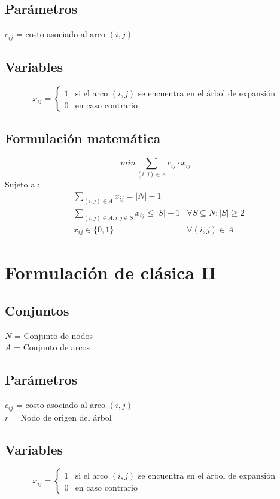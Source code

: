 \documentclass{article}
\numberwithin{equation}{section}
\begin{document}
\subsection{Parámetros}
$c_{ij}$ = costo asociado al arco $(i,j)$
\subsection{Variables}
\begin{flushleft}
\[x_{ij}={\begin{cases}1&{\mbox{si el arco $(i,j)$ se encuentra en el árbol de expansión}}\\0&{\mbox{en caso contrario}}\end{cases}}
\]
\end{flushleft}
\subsection{Formulación matemática}
\begin{equation}
min \sum_{(i,j) \in A} c_{ij} \cdot x_{ij}
\end{equation}
Sujeto a : \begin{align}
& \sum_{(i,j) \in A} x_{ij} = |N| - 1\\
& \sum_{(i,j) \in A: i,j \in S} x_{ij} \leq |S| - 1 &\forall S \subseteq N : |S| \geq 2 \\
& x_{ij} \in \{0,1\} &\forall (i,j) \in A
\end{align}

\newpage
\section{Formulación de clásica II}
\subsection{Conjuntos}
$N$ = Conjunto de nodos\\
$A$ = Conjunto de arcos
\subsection{Parámetros}
$c_{ij}$ = costo asociado al arco $(i,j)$\\
$r$ = Nodo de origen del árbol
\subsection{Variables}
\begin{flushleft}
\[x_{ij}={\begin{cases}1&{\mbox{si el arco $(i,j)$ se encuentra en el árbol de expansión}}\\0&{\mbox{en caso contrario}}\end{cases}}
\]
\end{flushleft}
\end{document}
